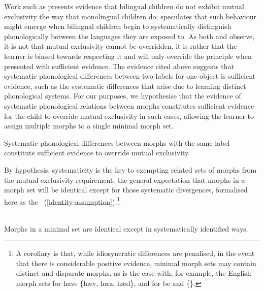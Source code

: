 Work such as \citet{Byers-Heinlein+:2009, Kandhadai+:2017} presents evidence that bilingual children do not exhibit mutual exclusivity the way that monolingual children do; \citet{Clark:1987} speculates that such behaviour might emerge when bilingual children begin to systematically distinguish phonologically between the languages they are exposed to. As both \citet{Markman+:1988} and \citet{Markman:1989} observe, it is not that mutual exclusivity cannot be overridden, it is rather that the learner is biased towards respecting it and will only override the principle when presented with sufficient evidence.  The evidence cited above suggests that systematic phonological differences between two labels for one object is sufficient evidence, such as the systematic differences that arise due to  learning distinct phonological systems. For our purposes, we hypothesise that the evidence of systematic phonological relations between morphs  constitutes sufficient evidence for the child to override mutual exclusivity in such cases, allowing the learner to assign multiple morphs to a single minimal morph set.

{
\begin{example}  \label{systematicity-hypothesis}

Systematic phonological differences between morphs with the same label constitute sufficient evidence to override mutual exclusivity.
\end{example}
}


By hypothesis, systematicity is the key to exempting related sets of morphs from the  mutual exclusivity requirement,  the  general expectation  that morphs in a morph set will be identical except for those systematic divergences, formalised here as the \Identity\ (\ref{identity-assumption}).\footnote{A corollary is that, while idiosyncratic differences are penalised, in the event that there is  considerable positive evidence, minimal morph sets may contain distinct and disparate morphs,  as is the case with, for example, the English morph sets for {\sc have} \{hæv, hæz, hæd\}, and for {\sc be} and  \{\}.}

\begin{example}  \label{identity-assumption}\\
Morphs in a minimal set are identical except in systematically identified ways. 
\end{example}

